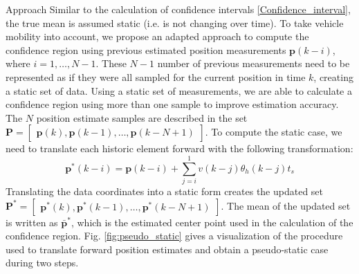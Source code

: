 \begin{section}{Approach}
Similar to the calculation of confidence intervals \eqref{Confidence_interval}, the true mean is assumed static (i.e. is not changing over time). To take vehicle mobility into account, we propose an adapted approach to compute the confidence region using previous estimated position measurements $\bm{p}(k-i)$, where $i=1,\dots,N-1$. These $N-1$ number of previous measurements need to be represented as if they were all sampled for the current position in time $k$, creating a static set of data. Using a static set of measurements, we are able to calculate a confidence region using more than one sample to improve estimation accuracy. The $N$ position estimate samples are described in the set $\bm{P}=\begin{bmatrix} \bm{p}(k) ,\bm{p}(k-1),\dots,\bm{p}(k-N+1) \end{bmatrix} $.
To compute the static case, we need to translate each historic element forward with the following transformation:
	\begin{equation}
	\bm{p}^*(k-i) = \bm{p}(k-i)+\sum_{j=i}^1 v(k-j)\theta_h(k-j)t_s 
	\end{equation}
Translating the data coordinates into a static form creates the updated set $\bm{P}^*=\begin{bmatrix} \bm{p}^*(k) ,\bm{p}^*(k-1),\dots,\bm{p}^*(k-N+1) \end{bmatrix} $.
The mean of the updated set is written as $\bar{\bm{p}}^*$, which is the estimated center point used in the calculation of the confidence region. Fig. \ref{fig:pseudo_static} gives a visualization of the procedure used to translate forward position estimates and obtain a pseudo-static case during two steps.


\end{section}
